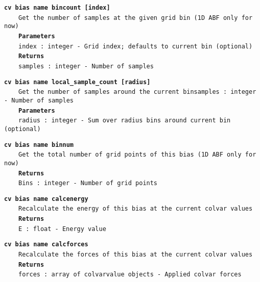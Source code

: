 \begin{mdexampleinput}{}
\texttt{\textbf{cv bias name bincount [index]}}
\\
\-~~~~\texttt{Get the number of samples at the given grid bin (1D ABF only for now)}
\\
\-~~~~\texttt{\textbf{Parameters}}
\\
\-~~~~\texttt{index : integer - Grid index; defaults to current bin (optional)}
\\
\-~~~~\texttt{\textbf{Returns}}
\\
\-~~~~\texttt{samples : integer - Number of samples}
\end{mdexampleinput}
\begin{mdexampleinput}{}
\texttt{\textbf{cv bias name local\_sample\_count [radius]}}
\\
\-~~~~\texttt{Get the number of samples around the current binsamples : integer - Number of samples}
\\
\-~~~~\texttt{\textbf{Parameters}}
\\
\-~~~~\texttt{radius : integer - Sum over radius bins around current bin (optional)}
\end{mdexampleinput}
\begin{mdexampleinput}{}
\texttt{\textbf{cv bias name binnum}}
\\
\-~~~~\texttt{Get the total number of grid points of this bias (1D ABF only for now)}
\\
\-~~~~\texttt{\textbf{Returns}}
\\
\-~~~~\texttt{Bins : integer - Number of grid points}
\end{mdexampleinput}
\begin{mdexampleinput}{}
\texttt{\textbf{cv bias name calcenergy}}
\\
\-~~~~\texttt{Recalculate the energy of this bias at the current colvar values}
\\
\-~~~~\texttt{\textbf{Returns}}
\\
\-~~~~\texttt{E : float - Energy value}
\end{mdexampleinput}
\begin{mdexampleinput}{}
\texttt{\textbf{cv bias name calcforces}}
\\
\-~~~~\texttt{Recalculate the forces of this bias at the current colvar values}
\\
\-~~~~\texttt{\textbf{Returns}}
\\
\-~~~~\texttt{forces : array of colvarvalue objects - Applied colvar forces}
\end{mdexampleinput}
